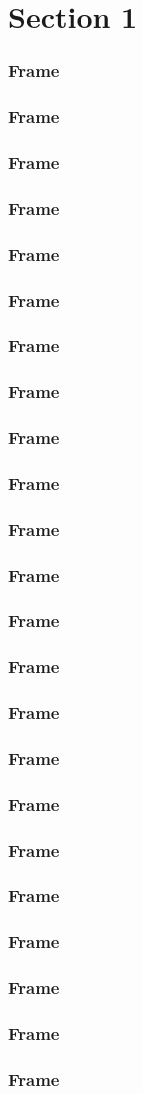 \documentclass[serif]{beamer}
\begin{document}
\makeatletter
\def\beamer@writeslidentry{\clearpage\beamer@notesactions}
\makeatother


\section{Section 1}
\begin{frame}
    \frametitle{Frame}
\end{frame}
\begin{frame}
    \frametitle{Frame}
\end{frame}
\begin{frame}
    \frametitle{Frame}
\end{frame}
\begin{frame}
    \frametitle{Frame}
\end{frame}
\begin{frame}
    \frametitle{Frame}
\end{frame}
\begin{frame}
    \frametitle{Frame}
\end{frame}
\begin{frame}
    \frametitle{Frame}
\end{frame}
\begin{frame}
    \frametitle{Frame}
\end{frame}
\begin{frame}
    \frametitle{Frame}
\end{frame}
\begin{frame}
    \frametitle{Frame}
\end{frame}
\begin{frame}
    \frametitle{Frame}
\end{frame}
\begin{frame}
    \frametitle{Frame}
\end{frame}
\begin{frame}
    \frametitle{Frame}
\end{frame}
\begin{frame}
    \frametitle{Frame}
\end{frame}
\begin{frame}
    \frametitle{Frame}
\end{frame}
\begin{frame}
    \frametitle{Frame}
\end{frame}
\begin{frame}
    \frametitle{Frame}
\end{frame}
\begin{frame}
    \frametitle{Frame}
\end{frame}
\begin{frame}
    \frametitle{Frame}
\end{frame}
\begin{frame}
    \frametitle{Frame}
\end{frame}
\begin{frame}
    \frametitle{Frame}
\end{frame}
\begin{frame}
    \frametitle{Frame}
\end{frame}
\begin{frame}
    \frametitle{Frame}
\end{frame}
\end{document}
